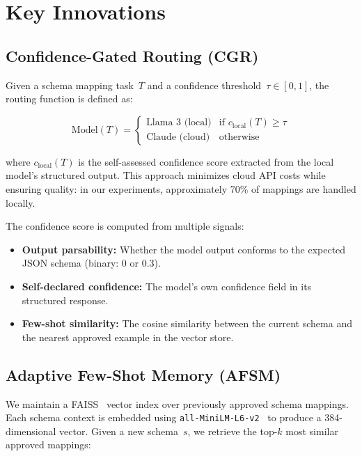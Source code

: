 \documentclass[conference]{IEEEtran}
\begin{document}
\section{Key Innovations}
\label{sec:innovations}

\subsection{Confidence-Gated Routing (CGR)}
\label{sec:cgr}

Given a schema mapping task~$T$ and a confidence threshold~$\tau \in [0,1]$,
the routing function is defined as:

\begin{equation}
  \text{Model}(T) =
  \begin{cases}
    \text{Llama~3 (local)} & \text{if } c_{\text{local}}(T) \geq \tau \\
    \text{Claude (cloud)}   & \text{otherwise}
  \end{cases}
  \label{eq:cgr}
\end{equation}

where $c_{\text{local}}(T)$ is the self-assessed confidence score extracted
from the local model's structured output. This approach minimizes cloud API
costs while ensuring quality: in our experiments, approximately 70\% of
mappings are handled locally.

The confidence score is computed from multiple signals:
\begin{itemize}
  \item \textbf{Output parsability:} Whether the model output conforms to the
    expected JSON schema (binary: 0 or 0.3).
  \item \textbf{Self-declared confidence:} The model's own confidence field
    in its structured response.
  \item \textbf{Few-shot similarity:} The cosine similarity between the current
    schema and the nearest approved example in the vector store.
\end{itemize}

\subsection{Adaptive Few-Shot Memory (AFSM)}
\label{sec:afsm}

We maintain a FAISS~\cite{johnson2019billion} vector index over previously
approved schema mappings. Each schema context is embedded using
\texttt{all-MiniLM-L6-v2}~\cite{reimers2019sentence} to produce a 384-dimensional
vector. Given a new schema~$s$, we retrieve the top-$k$ most similar approved
mappings:
\end{document}
